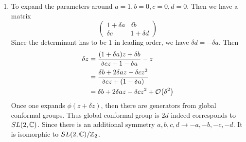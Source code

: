 \begin{enumerate}[label=(\alph*)]
	\item 
		To expand the parameters around $a=1, b=0,c=0,d=0$. Then we have a matrix
		\begin{equation}
			\begin{pmatrix} 1+\delta a & \delta b \\ \delta c & 1+\delta d \end{pmatrix}
		\end{equation}
		Since the determinant has to be $1$ in leading order, we have $\delta d = - \delta a$. Then
		\begin{align*}
			\delta z &= \frac{(1+\delta a)z + \delta b}{\delta c z + 1-\delta a} - z \\
						&= \frac{\delta b + 2 \delta a z - \delta c z^2}{\delta c z + (1-\delta a)} \\
						&= \delta b + 2 \delta a z - \delta c z^2 + \order{\delta^2}
		\end{align*}
		Once one expands $\phi(z+\delta z)$, then there are generators from global conformal groups. Thus global conformal group is $2d$ indeed corresponds to ${SL}(2,\mathbb{C})$. Since there is an additional symmetry $a,b,c,d \rightarrow -a,-b,-c,-d$. It is isomorphic to ${SL}(2,\mathbb{C})/\mathbb{Z}_2$.
\end{enumerate}
